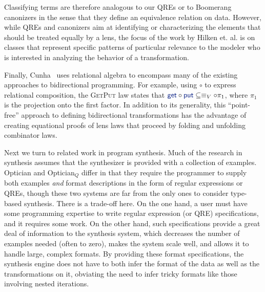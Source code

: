 \documentclass[acmsmall,review,anonymous]{acmart}
\newcommand{\kw}[1]{\textcolor{dkblue}{\ensuremath{\mathsf{#1}}}}
\newcommand{\get}{\ensuremath{\kw{get}}}
\newcommand{\lput}{\ensuremath{\kw{put}}}
\begin{document}
Classifying terms are therefore analogous to our QREs or to Boomerang canonizers
in the sense that they define an equivalence relation on data. However, while
QREs and canonizers aim at identifying or characterizing the elements that
should be treated equally by a lens, the focus of the work by Hilken et. al. is
on classes that represent specific patterns of particular relevance to the
modeler who is interested in analyzing the behavior of a transformation.

Finally, Cunha~\cite{cunha2010relational} uses relational algebra to encompass
many of the existing approaches to bidirectional programming. For example,
using $\circ$ to express relational composition, the \textsc{GetPut} law states
that $\get \circ \lput \subseteq \equiv_V \circ \pi_1$, where $\pi_1$ is the
projection onto the first factor. In addition to its generality, this
``point-free'' approach to defining bidirectional transformations has the
advantage of creating equational proofs of lens laws that proceed by folding
and unfolding combinator laws.

Next we turn to related work in program synthesis. Much of the research in
synthesis assumes that the synthesizer is provided with a collection of examples.
Optician and Optician$_Q$ differ in that they require the programmer to supply
both examples {\em and} format descriptions in the form of regular expressions
or QREs, though these two systems are far from the only ones to consider
type-based synthesis. There is a trade-off here.  On the one hand, a user must
have some programming expertise to write regular expression (or QRE)
specifications, and it requires some work. On the other hand, such
specifications provide a great deal of information to the synthesis system,
which decreases the number of examples needed (often to zero), makes the system
scale well, and allows it to handle large, complex formats.  By providing these
format specifications, the synthesis engine does not have to both infer the
format of the data as well as the transformations on it, obviating the need to
infer tricky formats like those involving nested iterations. 
\end{document}
